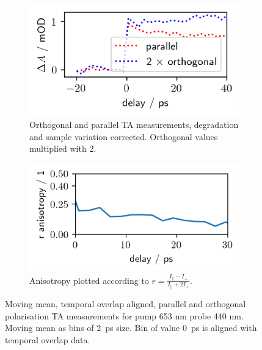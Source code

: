 \documentclass[twoside,openright,listof=numbered]{scrreprt}
\begin{document}
\begin{figure}[hbt]
\centering
\begin{subfigure}[t]{0.49\linewidth}
\includegraphics[scale=1]{images/440nm_ParallelOrthComparison.png}
\caption{Orthogonal and parallel TA measurements, degradation and sample variation corrected. Orthogonal values multiplied with 2.\label{fig:polarisationComp}}
\end{subfigure}
\hfill
\begin{subfigure}[t]{0.49\linewidth}
\includegraphics[scale=1]{images/440nm_ParallelOrthComparison_anisotropy.png}
\caption{Anisotropy plotted according to $r = \frac{I_\parallel-I_\perp}{I_\parallel + 2 I_\perp}$.}
\end{subfigure}
\caption[Moving mean transient absorption scan comparison and anisotropy development for orthogonal and parallel pump \qty{653}{\nano\meter} and probe \qty{440}{\nano\meter}.]{Moving mean, temporal overlap aligned, parallel and orthogonal polarisation TA measurements for pump 653 nm probe 440 nm. Moving mean as bins of \SI{2}{\pico\second} size. Bin of value \qty{0}{\pico\second} is aligned with temporal overlap data.\label{fig:440nmPolarisations}}
\end{figure}
\end{document}
